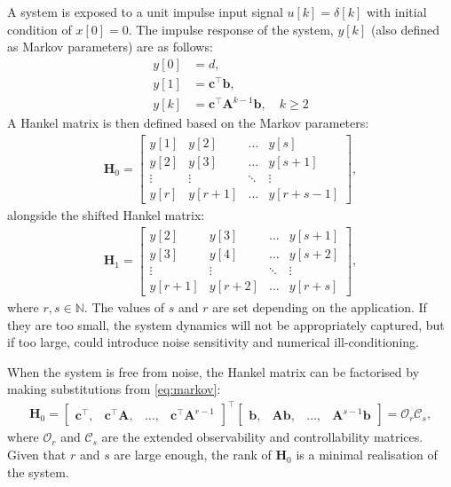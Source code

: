 A system is exposed to a unit impulse input signal $u[k] = \delta[k]$ with initial condition of $x[0] = 0$. The impulse response of the system, $y[k]$ (also defined as Markov parameters) are as follows:
\begin{subequations}
\label{eq:markov}
\begin{align}
    \label{eq:markov1}
    y[0] &= d,\\
    \label{eq:markov2}
    y[1] &= \mathbf{c}^\top \mathbf{b},\\
    \label{eq:markov3}
    y[k] &= \mathbf{c}^\top \mathbf{A}^{k-1} \mathbf{b}, \quad k \geq 2
\end{align}
\end{subequations}
A Hankel matrix is then defined based on the Markov parameters:
\begin{align}
\label{eq:hankel}
    \mathbf{H}_0 = 
    \begin{bmatrix} 
        y[1] & y[2] & \dots & y[s] \\
        y[2] & y[3] & \dots & y[s+1] \\
        \vdots & \vdots & \ddots & \vdots \\
        y[r] & y[r+1] & \dots & y[r+s-1]
    \end{bmatrix},
\end{align}
alongside the shifted Hankel matrix:
\begin{align}
\label{eq:shift-hankel}
    \mathbf{H}_1 = 
    \begin{bmatrix} 
        y[2] & y[3] & \dots & y[s+1] \\
        y[3] & y[4] & \dots & y[s+2] \\
        \vdots & \vdots & \ddots & \vdots \\
        y[r+1] & y[r+2] & \dots & y[r+s]
    \end{bmatrix},
\end{align}
where $r,s \in \mathbb{N}$. The values of $s$ and $r$ are set depending on the application. If they are too small, the system dynamics will not be appropriately captured, but if too large, could introduce noise sensitivity and numerical ill-conditioning.

When the system is free from noise, the Hankel matrix can be factorised by making substitutions from \eqref{eq:markov}:
\begin{align}
\label{eq:factorised}
    \mathbf{H}_0 = 
    \begin{bmatrix}
    \mathbf{c}^{\top}, & \mathbf{c}^{\top} \mathbf{A}, & \dots, & \mathbf{c}^{\top} \mathbf{A}^{r-1}
    \end{bmatrix}^{\top}
    \begin{bmatrix}
    \mathbf{b}, & \mathbf{A} \mathbf{b}, & \dots, & \mathbf{A}^{s-1} \mathbf{b}
    \end{bmatrix}
    = \mathcal{O}_r \mathcal{C}_s,
\end{align}
where $\mathcal{O}_r$ and $\mathcal{C}_s$ are the extended observability and controllability matrices. Given that $r$ and $s$ are large enough, the rank of $\mathbf{H}_0$ is a minimal realisation of the system.

